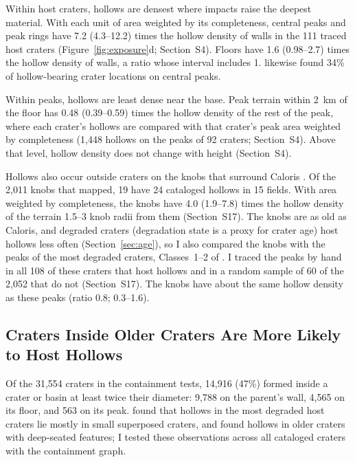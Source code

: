 \documentclass[article,review]{planetary}
\begin{document}
Within host craters, hollows are densest where impacts raise the deepest material. With each unit of area weighted by its completeness, central peaks and peak rings have 7.2 (4.3--12.2) times the hollow density of walls in the 111 traced host craters (Figure~\ref{fig:exposure}d; Section~S4). Floors have 1.6 (0.98--2.7) times the hollow density of walls, a ratio whose interval includes 1. \textcite{detoffoli2024} likewise found 34\% of hollow-bearing crater locations on central peaks.

Within peaks, hollows are least dense near the base. Peak terrain within 2~km of the floor has 0.48 (0.39--0.59) times the hollow density of the rest of the peak, where each crater's hollows are compared with that crater's peak area weighted by completeness (1,448 hollows on the peaks of 92 craters; Section~S4). Above that level, hollow density does not change with height (Section~S4).

Hollows also occur outside craters on the knobs that surround Caloris \parencite{wright2020}. Of the 2,011 knobs that \textcite{wright2020} mapped, 19 have 24 cataloged hollows in 15 fields. With area weighted by completeness, the knobs have 4.0 (1.9--7.8) times the hollow density of the terrain 1.5--3 knob radii from them (Section~S17). The knobs are as old as Caloris, and degraded craters (degradation state is a proxy for crater age) host hollows less often (Section~\ref{sec:age}), so I also compared the knobs with the peaks of the most degraded craters, Classes~1--2 of \textcite{kinczykMorphologicalEvaluationCrater2020}. I traced the peaks by hand in all 108 of these craters that host hollows and in a random sample of 60 of the 2,052 that do not (Section~S17). The knobs have about the same hollow density as these peaks (ratio 0.8; 0.3--1.6).

\FloatBarrier
\subsection{Craters Inside Older Craters Are More Likely to Host Hollows}
\label{sec:nesting}
Of the 31,554 craters in the containment tests, 14,916 (47\%) formed inside a crater or basin at least twice their diameter: 9,788 on the parent's wall, 4,565 on its floor, and 563 on its peak. \textcite{giroud2024} found that hollows in the most degraded host craters lie mostly in small superposed craters, and \textcite{detoffoli2024} found hollows in older craters with deep-seated features; I tested these observations across all cataloged craters with the containment graph.
\end{document}
